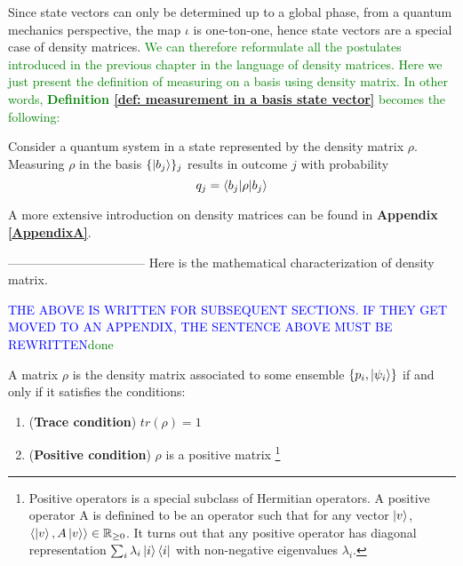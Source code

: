 Since state vectors can only be determined up to a global phase, from a quantum mechanics perspective, the map $\iota$ is one-ton-one, hence state vectors are a special case of density matrices. \textcolor{green}{We can therefore reformulate all the postulates introduced in the previous chapter in the language of density matrices. Here we just present the definition of measuring on a basis using density matrix. In other words, \textbf{Definition \ref{def: measurement in a basis state vector}} becomes the following:}


\begin{definition}
Consider a quantum system in a state represented by the density matrix $\rho$. Measuring $\rho$ in the basis $\{\ket{b_j}\}_j$ results in outcome $j$ with probability 
\begin{equation} \label{eqn: measurement probability in density matrix}
    q_j=\braket{b_j | \rho |b_j}
\end{equation}
\end{definition}

A more extensive introduction on density matrices can be found in \textbf{Appendix \ref{AppendixA}}.

---------------------------------
Here is the mathematical characterization of density matrix. 


\textcolor{blue}{THE ABOVE IS WRITTEN FOR SUBSEQUENT SECTIONS.  IF THEY GET MOVED TO AN APPENDIX, THE SENTENCE ABOVE MUST BE REWRITTEN}\textcolor{green}{done}

\begin{theorem}
A matrix $\rho$ is the density matrix associated to some ensemble $\{p_i, \ket{\psi_i}\}$ if and only if it satisfies the conditions:
\begin{enumerate}
    \item (\textbf{Trace condition}) $tr(\rho)=1$
    \item (\textbf{Positive condition}) $\rho$ is a positive matrix \footnote{Positive operators is a special subclass of Hermitian operators. A positive operator A is definined to be an operator such that for any vector $\ket{v}$, $\langle \ket{v}, A\ket{v} \rangle \in \mathbb{R}_{\ge 0}$. It turns out that any positive operator has diagonal representation $\sum_i \lambda_i \ket{i}\bra{i}$ with non-negative eigenvalues $\lambda_i$.} 
\end{enumerate}
\end{theorem}

